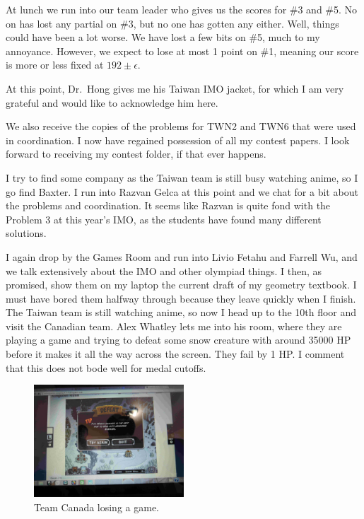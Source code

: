 \documentclass[11pt]{scrreprt}
\numberwithin{figure}{chapter}
\begin{document}
At lunch we run into our team leader who gives us the scores for \#3 and \#5.
No on has lost any partial on \#3, but no one has gotten any either.
Well, things could have been a lot worse.
We have lost a few bits on \#5, much to my annoyance.
However, we expect to lose at most 1 point on \#1, meaning our score is more or less fixed at $192 \pm \epsilon$.

At this point, Dr.\ Hong gives me his Taiwan IMO jacket, for which I am very grateful and would like to acknowledge him here.

We also receive the copies of the problems for TWN2 and TWN6 that were used in coordination.
I now have regained possession of all my contest papers.
I look forward to receiving my contest folder, if that ever happens.

I try to find some company as the Taiwan team is still busy watching anime, so
I go find Baxter. I run into Razvan Gelca at this point and we chat for a bit about the problems and coordination.
It seems like Razvan is quite fond with the Problem 3 at this year's IMO, as the students have found many different solutions.

I again drop by the Games Room and run into Livio Fetahu and Farrell Wu, and we talk extensively about the IMO
and other olympiad things. I then, as promised, show them on my laptop the current draft of my geometry textbook.
I must have bored them halfway through because they leave quickly when I finish.
The Taiwan team is still watching anime, so now I head up to the 10th floor and visit the Canadian team.
Alex Whatley lets me into his room, where they are playing a game and trying to defeat some snow creature
with around 35000 HP before it makes it all the way across the screen. They fail by 1 HP.
I comment that this does not bode well for medal cutoffs.

\begin{figure}[ht]
  \centering
  \includegraphics[width=0.5\textwidth]{media/1hp.jpg}
  \caption{Team Canada losing a game.}
\end{figure}
\end{document}
